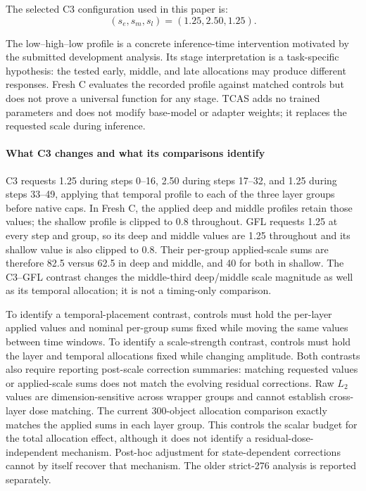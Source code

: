 \documentclass[times,twocolumn,final]{elsarticle}
\begin{document}
The selected C3 configuration used in this paper is:
\begin{equation}
(s_e, s_m, s_l) = (1.25, 2.50, 1.25).
\end{equation}

The low--high--low profile is a concrete inference-time intervention motivated by the submitted development analysis. Its stage interpretation is a task-specific hypothesis: the tested early, middle, and late allocations may produce different responses. Fresh C evaluates the recorded profile against matched controls but does not prove a universal function for any stage. TCAS adds no trained parameters and does not modify base-model or adapter weights; it replaces the requested scale during inference.

\paragraph{What C3 changes and what its comparisons identify}
C3 requests 1.25 during steps 0--16, 2.50 during steps 17--32, and 1.25 during steps 33--49, applying that temporal profile to each of the three layer groups before native caps. In Fresh C, the applied deep and middle profiles retain those values; the shallow profile is clipped to 0.8 throughout. GFL requests 1.25 at every step and group, so its deep and middle values are 1.25 throughout and its shallow value is also clipped to 0.8. Their per-group applied-scale sums are therefore 82.5 versus 62.5 in deep and middle, and 40 for both in shallow. The C3--GFL contrast changes the middle-third deep/middle scale magnitude as well as its temporal allocation; it is not a timing-only comparison.

To identify a temporal-placement contrast, controls must hold the per-layer applied values and nominal per-group sums fixed while moving the same values between time windows. To identify a scale-strength contrast, controls must hold the layer and temporal allocations fixed while changing amplitude. Both contrasts also require reporting post-scale correction summaries: matching requested values or applied-scale sums does not match the evolving residual corrections. Raw $L_2$ values are dimension-sensitive across wrapper groups and cannot establish cross-layer dose matching. The current 300-object allocation comparison exactly matches the applied sums in each layer group. This controls the scalar budget for the total allocation effect, although it does not identify a residual-dose-independent mechanism. Post-hoc adjustment for state-dependent corrections cannot by itself recover that mechanism. The older strict-276 analysis is reported separately.
\end{document}
